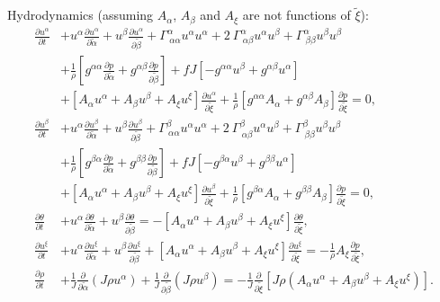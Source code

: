 \documentclass{article}
\newcommand{\pdiff}[2]{\frac{\partial #1}{\partial #2}}
\begin{document}
Hydrodynamics (assuming $A_\alpha$, $A_\beta$ and $A_\xi$ are not functions of $\tilde{\xi}$):
\begin{align}
\pdiff{u^\alpha}{t} & + u^\alpha \pdiff{u^\alpha}{\tilde{\alpha}} + u^\beta \pdiff{u^\alpha}{\tilde{\beta}} + \Gamma^{\alpha}_{\ \alpha \alpha} u^\alpha u^\alpha + 2\ \Gamma^{\alpha}_{\ \alpha \beta} u^\alpha u^\beta + \Gamma^{\alpha}_{\ \beta \beta} u^\beta u^\beta \nonumber \\ &  + \frac{1}{\rho} \left[ g^{\alpha \alpha} \pdiff{p}{\tilde{\alpha}} + g^{\alpha \beta} \pdiff{p}{\tilde{\beta}} \right] + f J \left[ - g^{\alpha \alpha} u^\beta + g^{\alpha \beta} u^\alpha \right] \nonumber \\
& + \left[A_\alpha u^\alpha + A_\beta u^\beta + A_\xi u^\xi \right] \pdiff{u^\alpha}{\tilde{\xi}} + \frac{1}{\rho} \left[ g^{\alpha \alpha} A_\alpha + g^{\alpha \beta} A_\beta \right] \pdiff{p}{\tilde{\xi}} = 0, \\
\pdiff{u^\beta}{t} & + u^\alpha \pdiff{u^\beta}{\tilde{\alpha}} + u^\beta \pdiff{u^\beta}{\tilde{\beta}} + \Gamma^{\beta}_{\ \alpha \alpha} u^\alpha u^\alpha + 2\ \Gamma^{\beta}_{\ \alpha \beta} u^\alpha u^\beta + \Gamma^{\beta}_{\ \beta \beta} u^\beta u^\beta \nonumber \\ &  + \frac{1}{\rho} \left[ g^{\beta \alpha} \pdiff{p}{\tilde{\alpha}} + g^{\beta \beta} \pdiff{p}{\tilde{\beta}} \right] + f J \left[ - g^{\beta \alpha} u^\beta + g^{\beta \beta} u^\alpha \right] \nonumber \\
& + \left[A_\alpha u^\alpha + A_\beta u^\beta + A_\xi u^\xi \right] \pdiff{u^\beta}{\tilde{\xi}} + \frac{1}{\rho} \left[ g^{\beta \alpha} A_\alpha + g^{\beta \beta} A_\beta \right] \pdiff{p}{\tilde{\xi}} = 0, \\
\pdiff{\theta}{t} & + u^\alpha \pdiff{\theta}{\tilde{\alpha}} + u^\beta \pdiff{\theta}{\tilde{\beta}} = - \left[ A_\alpha u^\alpha + A_\beta u^\beta + A_\xi u^\xi \right] \pdiff{\theta}{\tilde{\xi}}, \\
\pdiff{u^\xi}{t} & + u^\alpha \pdiff{u^\xi}{\tilde{\alpha}} + u^\beta \pdiff{u^\xi}{\tilde{\beta}} + \left[ A_\alpha u^\alpha + A_\beta u^\beta + A_\xi u^\xi \right] \pdiff{u^\xi}{\tilde{\xi}} = - \frac{1}{\rho} A_\xi \pdiff{p}{\tilde{\xi}}, \\
\pdiff{\rho}{t} & + \frac{1}{J} \pdiff{}{\tilde{\alpha}} \left( J \rho u^\alpha \right) + \frac{1}{J} \pdiff{}{\tilde{\beta}} \left( J \rho u^\beta \right) = - \frac{1}{J} \pdiff{}{\tilde{\xi}} \left[ J \rho \left( A_\alpha u^\alpha + A_\beta u^\beta + A_\xi u^\xi \right) \right].
\end{align}
\end{document}
